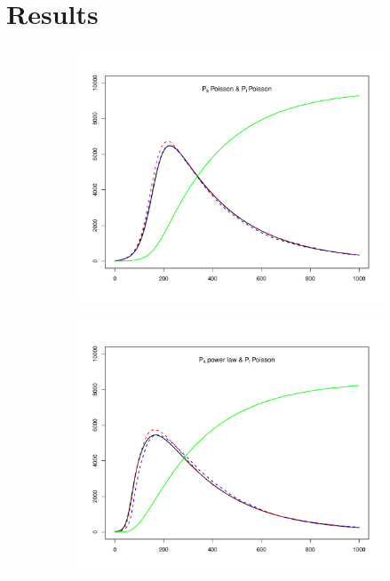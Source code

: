 \section{Results}
\begin{figure}[hbtp]
    \centering
    \begin{subfigure}[b]{0.45\textwidth}
        \centering
          \includegraphics[width=\textwidth, trim=30 20 30 20, clip]{../img/sir_00.pdf}
    \end{subfigure}
    \hspace{0.08\textwidth}
    \begin{subfigure}[b]{0.45\textwidth}
        \centering
          \includegraphics[width=\textwidth, trim=30 20 30 20, clip]{../img/sir_10.pdf}

\end{subfigure}
\end{figure}
